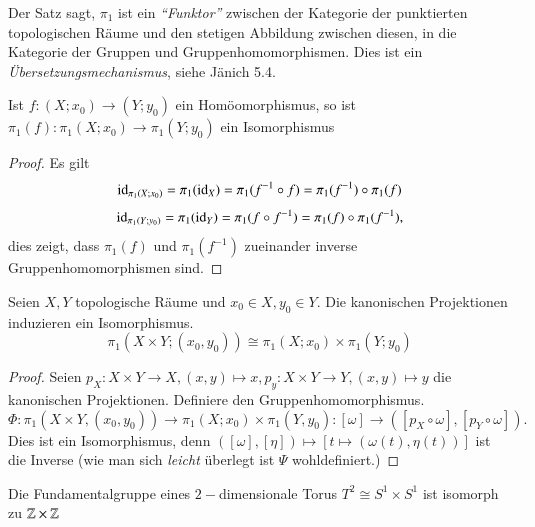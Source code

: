 \documentclass[a4paper,10pt]{scrartcl}
\newcommand{\homo}{\cong}
\begin{document}
\begin{note*}
 Der Satz sagt, $\pi_1$ ist ein \emph{"`Funktor"'} zwischen der Kategorie der punktierten topologischen Räume und den stetigen Abbildung zwischen diesen, in die Kategorie der Gruppen und Gruppenhomomorphismen. Dies ist ein \emph{Übersetzungsmechanismus}, siehe Jänich 5.4.
\end{note*}
\begin{kor}
 Ist $f:(X; x_0)\to (Y; y_0)$ ein Homöomorphismus, so ist $\pi_1(f):\pi_1(X;x_0) \to \pi_1(Y;y_0)$ ein Isomorphismus
\end{kor}
\begin{proof}
 Es gilt 
\[
\operatorname{id}_{\pi_1(X; x_0)}= \pi_1(\operatorname{id}_X)=\pi_1(f^{-1}\circ f)=\pi_1(f^{-1})\circ \pi_1(f)
\]
\[
 \operatorname{id}_{\pi_1(Y;y_0)}=\pi_1(\operatorname{id}_Y)=\pi_1(f\circ f^{-1})=\pi_1(f) \circ \pi_1(f^{-1}),
\]
dies zeigt, dass $\pi_1(f)$ und $\pi_1(f^{-1})$ zueinander inverse Gruppenhomomorphismen sind.
\end{proof}
\begin{st}
 Seien $X,Y$ topologische Räume und $x_0\in X, y_0\in Y$. Die kanonischen Projektionen induzieren ein Isomorphismus.
\[
 \pi_1(X\times Y; (x_0, y_0)) \homo \pi_1(X;x_0) \times \pi_1(Y; y_0)
\]
\end{st}
\begin{proof}
 Seien $p_X: X\times Y \to X, (x,y) \mapsto x, p_y: X\times Y \to Y, (x,y) \mapsto y$ die kanonischen Projektionen. Definiere den Gruppenhomomorphismus.
\[
 \Phi: \pi_1(X\times Y, (x_0, y_0)) \to \pi_1(X;x_0)\times \pi_1(Y,y_0): [\omega] \to ([p_X\circ \omega], [p_Y \circ \omega]).
\]
Dies ist ein Isomorphismus, denn $([\omega],[\eta])\mapsto [t\mapsto (\omega(t), \eta(t))]$ ist die Inverse (wie man sich \emph{leicht} überlegt ist $\Psi$ wohldefiniert.)
\end{proof}
\begin{kor}
  Die Fundamentalgruppe eines $2-$dimensionale Torus $T^2 \homo S^1 \times S^1$ ist isomorph zu $\mathbb{Z}\times \mathbb{Z}$


\end{kor}
\end{document}
